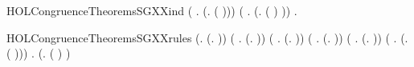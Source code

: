 \begin{SaveVerbatim}{HOLCongruenceTheoremsSGXXind}
       (\HOLSymConst{\HOLTokenForall{}} .   \HOLSymConst{\HOLTokenImp{}}  (\HOLTokenLambda{}. \HOLConst{\ensuremath{\nu}}  ( ))) \HOLSymConst{\HOLTokenConj{}}
       (\HOLSymConst{\HOLTokenForall{}} .   \HOLSymConst{\HOLTokenImp{}}  (\HOLTokenLambda{}.  ( ) )) \HOLSymConst{\HOLTokenImp{}}
       \HOLSymConst{\HOLTokenForall{}}.   \HOLSymConst{\HOLTokenImp{}}  
\end{SaveVerbatim}
\newcommand{\HOLCongruenceTheoremsSGXXind}{\UseVerbatim{HOLCongruenceTheoremsSGXXind}}
\begin{SaveVerbatim}{HOLCongruenceTheoremsSGXXrules}
\HOLTokenTurnstile{} (\HOLSymConst{\HOLTokenForall{}}.  (\HOLTokenLambda{}. )) \HOLSymConst{\HOLTokenConj{}}
   (\HOLSymConst{\HOLTokenForall{}} .   \HOLSymConst{\HOLTokenImp{}}  (\HOLTokenLambda{}.   )) \HOLSymConst{\HOLTokenConj{}}
   (\HOLSymConst{\HOLTokenForall{}} .   \HOLSymConst{\HOLTokenImp{}}  (\HOLTokenLambda{}.  )) \HOLSymConst{\HOLTokenConj{}}
   (\HOLSymConst{\HOLTokenForall{}} .   \HOLSymConst{\HOLTokenConj{}}   \HOLSymConst{\HOLTokenImp{}}  (\HOLTokenLambda{}.   \HOLSymConst{\ensuremath{+}}  )) \HOLSymConst{\HOLTokenConj{}}
   (\HOLSymConst{\HOLTokenForall{}} .   \HOLSymConst{\HOLTokenConj{}}   \HOLSymConst{\HOLTokenImp{}}  (\HOLTokenLambda{}.   \HOLSymConst{\ensuremath{\parallel}}  )) \HOLSymConst{\HOLTokenConj{}}
   (\HOLSymConst{\HOLTokenForall{}} .   \HOLSymConst{\HOLTokenImp{}}  (\HOLTokenLambda{}. \HOLConst{\ensuremath{\nu}}  ( ))) \HOLSymConst{\HOLTokenConj{}}
   \HOLSymConst{\HOLTokenForall{}} .   \HOLSymConst{\HOLTokenImp{}}  (\HOLTokenLambda{}.  ( ) )
\end{SaveVerbatim}
